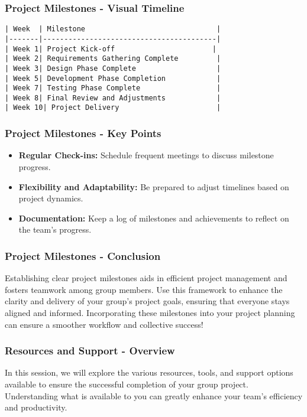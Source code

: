 \documentclass[aspectratio=169]{beamer}
\begin{document}
\begin{frame}[fragile]
    \frametitle{Project Milestones - Visual Timeline}
    \begin{lstlisting}
| Week  | Milestone                               |
|-------|-----------------------------------------|
| Week 1| Project Kick-off                       |
| Week 2| Requirements Gathering Complete         |
| Week 3| Design Phase Complete                   |
| Week 5| Development Phase Completion            |
| Week 7| Testing Phase Complete                  |
| Week 8| Final Review and Adjustments            |
| Week 10| Project Delivery                       |
    \end{lstlisting}
\end{frame}

\begin{frame}[fragile]
    \frametitle{Project Milestones - Key Points}
    \begin{itemize}
        \item \textbf{Regular Check-ins:} Schedule frequent meetings to discuss milestone progress.
        \item \textbf{Flexibility and Adaptability:} Be prepared to adjust timelines based on project dynamics.
        \item \textbf{Documentation:} Keep a log of milestones and achievements to reflect on the team’s progress.
    \end{itemize}
\end{frame}

\begin{frame}[fragile]
    \frametitle{Project Milestones - Conclusion}
    Establishing clear project milestones aids in efficient project management and fosters teamwork among group members. Use this framework to enhance the clarity and delivery of your group's project goals, ensuring that everyone stays aligned and informed. Incorporating these milestones into your project planning can ensure a smoother workflow and collective success!
\end{frame}

\begin{frame}[fragile]
  \frametitle{Resources and Support - Overview}
  In this session, we will explore the various resources, tools, and support options available to ensure the successful completion of your group project. Understanding what is available to you can greatly enhance your team's efficiency and productivity.
\end{frame}
\end{document}
